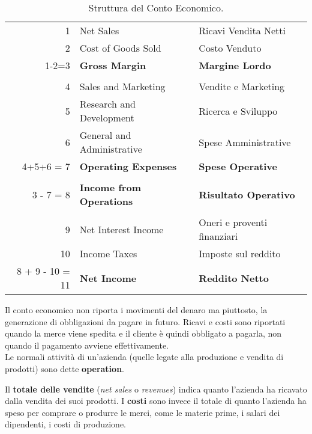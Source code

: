 \documentclass[a4paper,portrait,12pt]{article}
\theoremstyle{definition}
\begin{document}
\begin{table}[H]
\centering
\begin{tabular}{r|p{.35\linewidth}|p{.35\linewidth}}
1 & Net Sales & Ricavi Vendita Netti\\
2 & Cost of Goods Sold & Costo Venduto\\
\hline
1-2=3 & \textbf{Gross Margin} & \textbf{Margine Lordo}\\
 & \\
4 & Sales and Marketing & Vendite e Marketing\\
5 & Research and Development & Ricerca e Sviluppo\\
6 & General and Administrative & Spese Amministrative\\
\hline
4+5+6 = 7 & \textbf{Operating Expenses} & \textbf{Spese Operative}\\
 & \\
3 - 7 = 8 & \textbf{Income from Operations} & \textbf{Risultato Operativo}\\
& \\
\hline
9 & Net Interest Income & Oneri e proventi finanziari\\
10 & Income Taxes & Imposte sul reddito\\
\hline
8 + 9 - 10 = 11 & \textbf{Net Income} & \textbf{Reddito Netto}\\
\hline 
\end{tabular}
\caption{Struttura del Conto Economico.}
\end{table}

Il conto economico non riporta i movimenti del denaro ma piuttosto, la generazione di obbligazioni da pagare in futuro.
Ricavi e costi sono riportati quando la merce viene spedita e il cliente è quindi obbligato a pagarla, non quando il pagamento avviene effettivamente.\\

Le normali attività di un'azienda (quelle legate alla produzione e vendita di prodotti) sono dette \textbf{operation}.

Il \textbf{totale delle vendite} (\emph{net sales} o \emph{revenues}) indica quanto l'azienda ha ricavato dalla vendita dei suoi prodotti. 
I \textbf{costi} sono invece il totale di quanto l'azienda ha speso per comprare o produrre le merci, come le materie prime, i salari dei dipendenti, i costi di produzione.
\end{document}
